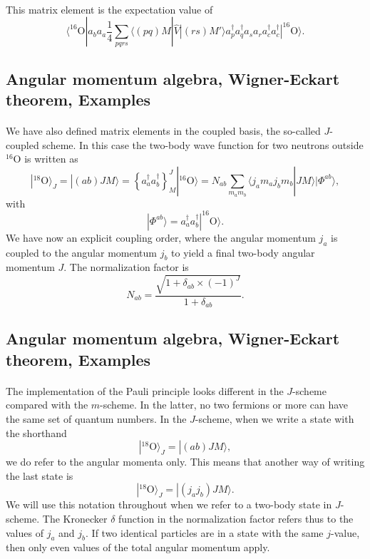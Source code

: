 \documentclass[%
twoside,                 %
final,                   %
10pt]{article}
\begin{document}
\paragraph{}
This matrix element is the expectation value of 
\[
\langle ^{16}\mathrm{O}|a_ba_a\frac{1}{4}\sum_{pqrs}\langle (pq) M | \hat{V} | (rs) M' \rangle a^{\dagger}_pa^{\dagger}_qa_sa_r a^{\dagger}_ca^{\dagger}_c|^{16}\mathrm{O}\rangle.
\]




\subsection*{Angular momentum algebra, Wigner-Eckart theorem, Examples}

\paragraph{}
We have also defined matrix elements in the coupled basis, the so-called $J$-coupled scheme.
In this case the two-body wave function for two neutrons outside ${}^{16}\mbox{O}$ is written as 
\[
|^{18}\mathrm{O}\rangle_J =|(ab)JM\rangle  = \left\{a^{\dagger}_aa^{\dagger}_b\right\}^J_M|^{16}\mathrm{O}\rangle=N_{ab}\sum_{m_am_b}\langle j_am_aj_bm_b|JM\rangle|\Phi^{ab}\rangle, 
\]
with 
\[
|\Phi^{ab}\rangle=a^{\dagger}_aa^{\dagger}_b|^{16}\mathrm{O}\rangle.
\]
We have now an explicit coupling order, where the angular momentum $j_a$ is coupled to the angular momentum $j_b$ to yield a final two-body angular momentum $J$. 
The normalization factor is
\[
N_{ab}=\frac{\sqrt{1+\delta_{ab}\times (-1)^J}}{1+\delta_{ab}}.
\]




\subsection*{Angular momentum algebra, Wigner-Eckart theorem, Examples}

\paragraph{}
The implementation of the Pauli principle looks different in the $J$-scheme compared with the $m$-scheme. In the latter, no two fermions or more can have the same set of quantum numbers. In the $J$-scheme, when we write a state with the shorthand 
\[
|^{18}\mathrm{O}\rangle_J =|(ab)JM\rangle,
\]
we do refer to the angular momenta only. This means that another way of writing the last state is
\[
|^{18}\mathrm{O}\rangle_J =|(j_aj_b)JM\rangle.
\]
We will use this notation throughout when we refer to a two-body state in $J$-scheme. The Kronecker $\delta$ function in the normalization factor 
refers thus to the values of $j_a$ and $j_b$. If two identical particles are in a state with the same $j$-value, then only even values of the total angular momentum apply.
\end{document}

